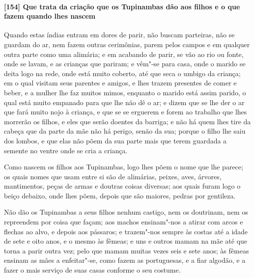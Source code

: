 \begin{linenumbers}
\paragraph{[154] Que trata da criação que os Tupinambas dão aos filhos e o que fazem quando
lhes nascem}\quad
Quando estas índias entram em dores de parir, não buscam parteiras, não se guardam do ar,
nem fazem outras cerimônias, parem pelos campos e em qualquer outra parte como uma
alimária; e em acabando de parir, se vão ao rio ou fonte, onde se lavam, e as crianças que
pariram; e vêm"-se para casa, onde o marido se deita logo na rede, onde está muito coberto,
até que seca o umbigo da criança; em o qual visitam seus parentes e amigos, e lhes trazem
presentes de comer e beber, e a mulher lhe faz muitos mimos, enquanto o marido está assim
parido, o qual está muito empanado para que lhe não dê o ar; e dizem que se lhe der o ar
que fará muito nojo à criança, e que se se erguerem e forem ao trabalho que lhes morrerão
os filhos, e eles que serão doentes da barriga; e não há quem lhes tire da cabeça que da
parte da mãe não há perigo, senão da sua; porque o filho lhe saiu dos lombos, e que elas
não põem da sua parte mais que terem guardada a semente no ventre onde se cria a criança.

Como nascem os filhos aos Tupinambas, logo lhes põem o nome que lhe parece; os quais nomes
que usam entre si são de alimárias, peixes, aves, árvores, mantimentos, peças de armas e
doutras coisas diversas; aos quais furam logo o beiço debaixo, onde lhes põem, depois que
são maiores, pedras por gentileza.

Não dão os Tupinambas a seus filhos nenhum castigo, nem os doutrinam, nem os repreendem
por coisa que façam; aos machos ensinam"-nos a atirar com arcos e flechas ao alvo, e depois
aos pássaros; e trazem"-nos sempre às costas até a idade de sete e oito anos, e o mesmo às
fêmeas; e uns e outros mamam na mãe até que torna a parir outra vez; pelo que mamam muitas
vezes seis e sete anos; às fêmeas ensinam as mães a enfeitar"-se, como fazem as
portuguesas, e a fiar algodão, e a fazer o mais serviço de suas casas conforme o seu costume.



\end{linenumbers}
